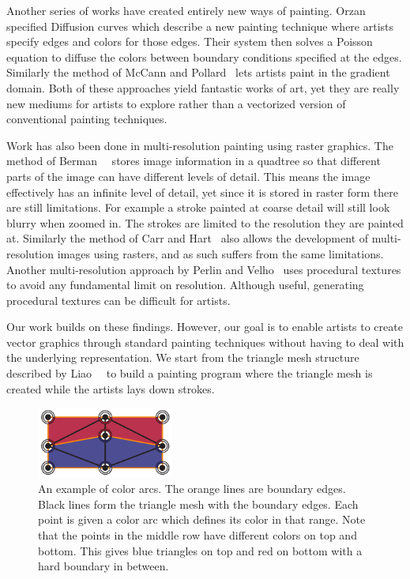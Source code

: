 \documentclass[review]{acmsiggraph}
\begin{document}
Another series of works have created entirely new ways of painting. Orzan~\etal~
specified Diffusion curves which
describe a new painting technique where artists specify edges and colors for those edges. Their system
then solves a Poisson equation to diffuse the colors between boundary conditions specified at the edges.
Similarly the method of McCann and Pollard~
lets artists paint in the gradient domain. Both of these approaches yield fantastic works of art, yet
they are really new mediums for artists to explore rather than a vectorized version of conventional
painting techniques.

Work has also been done in multi-resolution painting using raster graphics. The method of Berman~\etal~
stores image information in a quadtree so that different parts of the image can have different levels of detail.
This means the image effectively has an infinite level of detail, yet since it is stored in raster form
there are still limitations. For example a stroke painted at coarse detail will still look blurry when
zoomed in. The strokes are limited to the resolution they are painted at. Similarly the method of Carr and Hart~
also allows the development of multi-resolution images using rasters, and as such suffers from the
same limitations. Another multi-resolution approach by Perlin and Velho~ uses
procedural textures to avoid any fundamental limit on resolution. Although useful,
generating procedural textures can be difficult for artists.

Our work builds on these findings. However, our goal is to enable artists to create vector
graphics through standard painting techniques without having to deal with the underlying representation.
We start from the triangle mesh structure described by Liao~\etal~ to build a painting program
where the triangle mesh is created while the artists lays down strokes. 

\begin{figure}
    \centering
        \includegraphics[width=0.4\textwidth]{images/colorarcsfinal}
    \caption{An example of color arcs. The orange lines are boundary edges. Black lines form the triangle
    mesh with the boundary edges. Each point is given a color arc which defines its color in that range.
    Note that the points in the middle row have different colors on top and bottom. This gives blue
    triangles on top and red on bottom with a hard boundary in between.}
    \label{fig:arcs}
\end{figure}
\end{document}
